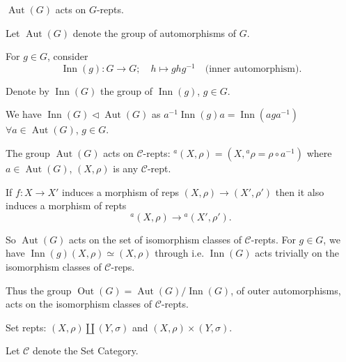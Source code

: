 \documentclass[11pt, a4paper]{report}
\begin{document}
\begin{definition}
$\operatorname{Aut}(G)$ acts on $G$-repts.

Let $\operatorname{Aut}(G)$ denote the group of automorphisms of $G$.

For $g \in G$, consider
\[
\operatorname{Inn}(g): G \rightarrow G; \quad h \mapsto ghg^{-1} \quad \text{(inner automorphism)}.
\]

Denote by $\operatorname{Inn}(G)$ the group of $\operatorname{Inn}(g)$, $g \in G$.

We have $\operatorname{Inn}(G) \triangleleft \operatorname{Aut}(G)$ as $a^{-1}\operatorname{Inn}(g)a = \operatorname{Inn}(aga^{-1})$ $\forall a \in \operatorname{Aut}(G)$, $g \in G$.

The group $\operatorname{Aut}(G)$ acts on $\mathcal{C}$-repts:
${}^{a}(X, \rho) = (X, {}^{a}\rho = \rho \circ a^{-1})$ where $a \in \operatorname{Aut}(G)$, $(X, \rho)$ is any $\mathcal{C}$-rept.

If $f: X \rightarrow X'$ induces a morphism of reps $(X, \rho) \rightarrow (X', \rho')$ then it also induces a morphism of repts
\[
{}^{a}(X, \rho) \rightarrow {}^{a}(X', \rho').
\]

So $\operatorname{Aut}(G)$ acts on the set of isomorphism classes of $\mathcal{C}$-repts. For $g \in G$, we have $\operatorname{Inn}(g)(X, \rho) \simeq (X, \rho)$ through
i.e. $\operatorname{Inn}(G)$ acts trivially on the isomorphism classes of $\mathcal{C}$-reps.

Thus the group $\operatorname{Out}(G) = \operatorname{Aut}(G)/\operatorname{Inn}(G)$, of outer automorphisms, acts on the isomorphism classes of $\mathcal{C}$-repts.
\end{definition}

\begin{definition}
Set repts: $(X, \rho) \amalg (Y, \sigma)$ and $(X, \rho) \times (Y, \sigma)$.

Let $\mathcal{C}$ denote the Set Category.
\end{definition}
\end{document}
